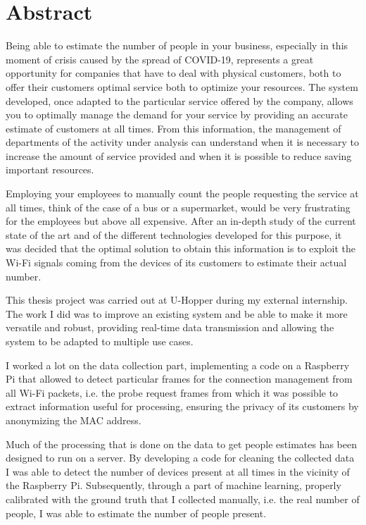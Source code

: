 \chapter*{Abstract} %
\label{abstract}

\vspace{0.4 cm} 

Being able to estimate the number of people in your business, especially in this moment of crisis caused by the spread of COVID-19, represents a great opportunity for companies that have to deal with physical customers, both to offer their customers optimal service both to optimize your resources. The system developed, once adapted to the particular service offered by the company, allows you to optimally manage the demand for your service by providing an accurate estimate of customers at all times. From this information, the management of departments of the activity under analysis can understand when it is necessary to increase the amount of service provided and when it is possible to reduce saving important resources.

Employing your employees to manually count the people requesting the service at all times, think of the case of a bus or a supermarket, would be very frustrating for the employees but above all expensive. After an in-depth study of the current state of the art and of the different technologies developed for this purpose, it was decided that the optimal solution to obtain this information is to exploit the Wi-Fi signals coming from the devices of its customers to estimate their actual number.

This thesis project was carried out at U-Hopper during my external internship. The work I did was to improve an existing system and be able to make it more versatile and robust, providing real-time data transmission and allowing the system to be adapted to multiple use cases.

I worked a lot on the data collection part, implementing a code on a Raspberry Pi that allowed to detect particular frames for the connection management from all Wi-Fi packets, i.e. the probe request frames from which it was possible to extract information useful for processing, ensuring the privacy of its customers by anonymizing the MAC address.

Much of the processing that is done on the data to get people estimates has been designed to run on a server. By developing a code for cleaning the collected data I was able to detect the number of devices present at all times in the vicinity of the Raspberry Pi. Subsequently, through a part of machine learning, properly calibrated with the ground truth that I collected manually, i.e. the real number of people, I was able to estimate the number of people present.

